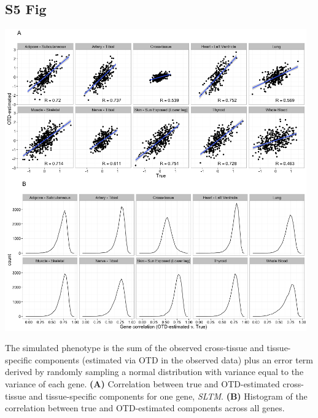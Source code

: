 \documentclass[10pt,letterpaper]{article}
\begin{document}
\begin{singlespace}
\subsection*{S5 Fig}
\includegraphics[width=13cm]{Figures/sim_v_obs_SLTM_ALL.png}
\label{S5_Fig}

 The simulated phenotype is the sum of the observed cross-tissue and tissue-specific components (estimated via OTD in the observed data) plus an error term derived by randomly sampling a normal distribution with variance equal to the variance of each gene. {\bf (A)} Correlation between true and OTD-estimated cross-tissue and tissue-specific components for one gene, \textit{SLTM}.  {\bf(B)} Histogram of the correlation between true and OTD-estimated components across all genes.


\end{singlespace}
\end{document}

